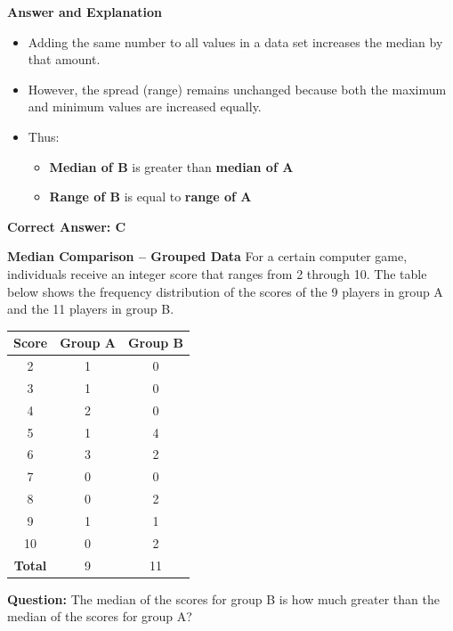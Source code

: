 \documentclass{beamer}
\begin{document}
\begin{frame}{\textbf{Answer and Explanation}}
\begin{itemize}
    \item Adding the same number to all values in a data set increases the median by that amount.
    \item However, the spread (range) remains unchanged because both the maximum and minimum values are increased equally.
    \item Thus:
    \begin{itemize}
        \item \textbf{Median of B} is greater than \textbf{median of A}
        \item \textbf{Range of B} is equal to \textbf{range of A}
    \end{itemize}
\end{itemize}

\textbf{Correct Answer: C}
\end{frame}







\begin{frame}{\textbf{Median Comparison – Grouped Data}}
\small
For a certain computer game, individuals receive an integer score that ranges from 2 through 10. The table below shows the frequency distribution of the scores of the 9 players in group A and the 11 players in group B.

\begin{center}
\begin{tabular}{|c|c|c|}
\hline
\textbf{Score} & \textbf{Group A} & \textbf{Group B} \\
\hline
2 & 1 & 0 \\
3 & 1 & 0 \\
4 & 2 & 0 \\
5 & 1 & 4 \\
6 & 3 & 2 \\
7 & 0 & 0 \\
8 & 0 & 2 \\
9 & 1 & 1 \\
10 & 0 & 2 \\
\hline
\textbf{Total} & 9 & 11 \\
\hline
\end{tabular}
\end{center}

\vspace{2mm}
\textbf{Question:} The median of the scores for group B is how much greater than the median of the scores for group A?
\end{frame}
\end{document}

